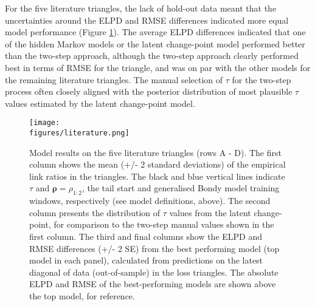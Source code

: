 For the five literature triangles, the lack
of hold-out data meant that the uncertainties
around the ELPD and RMSE differences
indicated more equal model performance
(Figure \ref{fig:literature}).
The average ELPD
differences indicated that one of the hidden
Markov models or the latent change-point
model performed better than the
two-step approach, although the two-step approach
clearly performed best in terms of RMSE
for the \cite{verrall2015} triangle,
and was on par with the other models
for the remaining literature triangles.
The manual selection of $\tau$
for the two-step process often
closely aligned with the 
posterior distribution of most
plausible $\tau$ values estimated by the latent
change-point model.

\begin{figure}
    \centering
    \hspace{-1em}
    \texttt{[image: \\figures/literature.png]}
    \caption{
        Model results on the five literature triangles
        (rows A - D). The first
        column shows the mean (+/- 2 standard deviations)
        of the empirical link ratios in the triangles.
        The black and blue vertical lines indicate $\tau$
        and $\bm{\rho} = \rho_{1:2}$, the tail start
        and generalised Bondy model training windows,
        respectively (see model definitions, above).
        The second column presents the distribution
        of $\tau$ values from the latent change-point,
        for comparison to the two-step manual values
        shown in the first column.
        The third and final columns show the
        ELPD and RMSE differences (+/- 2 SE) from the best
        performing model (top model in each panel), calculated
        from predictions on the latest diagonal of
        data (out-of-sample) in the loss triangles.
        The absolute ELPD and RMSE of the best-performing
        models are shown above the top model, for reference.
    }
	\label{fig:literature}
\end{figure}


